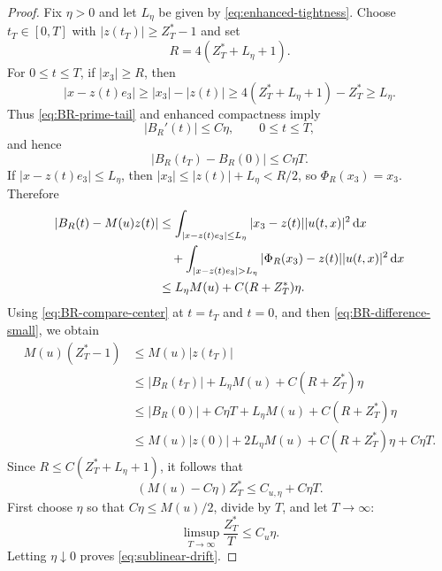 \documentclass[10pt,a4paper]{amsart}
\newcommand{\dd}{\,\mathrm d}
\newcommand{\ez}{e_3}
\begin{document}
\begin{proof}
Fix $\eta>0$ and let $L_\eta$ be given by \eqref{eq:enhanced-tightness}.  Choose $t_T\in[0,T]$ with $|z(t_T)|\ge Z_T^*-1$ and set
\begin{equation}\label{eq:R-center-mass}
  R=4(Z_T^*+L_\eta+1).
\end{equation}
For $0\le t\le T$, if $|x_3|\ge R$, then
\[
  |x-z(t)\ez|\ge |x_3|-|z(t)|\ge 4(Z_T^*+L_\eta+1)-Z_T^*\ge L_\eta.
\]
Thus \eqref{eq:BR-prime-tail} and enhanced compactness imply
\[
  |B_R'(t)|\le C\eta,
  \qquad 0\le t\le T,
\]
and hence
\begin{equation}\label{eq:BR-difference-small}
  |B_R(t_T)-B_R(0)|\le C\eta T.
\end{equation}
If $|x-z(t)\ez|\le L_\eta$, then $|x_3|\le |z(t)|+L_\eta<R/2$, so $\Phi_R(x_3)=x_3$.  Therefore
\begin{align}
  |B_R(t)-M(u)z(t)|
  &\le \int_{|x-z(t)\ez|\le L_\eta}|x_3-z(t)||u(t,x)|^2\dd x \notag\\
  &\quad +\int_{|x-z(t)\ez|>L_\eta}|\Phi_R(x_3)-z(t)||u(t,x)|^2\dd x \notag\\
  &\le L_\eta M(u)+C(R+Z_T^*)\eta.\label{eq:BR-compare-center}
\end{align}
Using \eqref{eq:BR-compare-center} at $t=t_T$ and $t=0$, and then \eqref{eq:BR-difference-small}, we obtain
\begin{align*}
  M(u)(Z_T^*-1)
  &\le M(u)|z(t_T)| \\
  &\le |B_R(t_T)|+L_\eta M(u)+C(R+Z_T^*)\eta \\
  &\le |B_R(0)|+C\eta T+L_\eta M(u)+C(R+Z_T^*)\eta \\
  &\le M(u)|z(0)|+2L_\eta M(u)+C(R+Z_T^*)\eta+C\eta T.
\end{align*}
Since $R\le C(Z_T^*+L_\eta+1)$, it follows that
\[
  (M(u)-C\eta)Z_T^*\le C_{u,\eta}+C\eta T.
\]
First choose $\eta$ so that $C\eta\le M(u)/2$, divide by $T$, and let $T\to\infty$:
\[
  \limsup_{T\to\infty}\frac{Z_T^*}{T}\le C_u\eta.
\]
Letting $\eta\downarrow0$ proves \eqref{eq:sublinear-drift}.
\end{proof}
\end{document}
